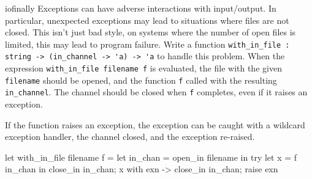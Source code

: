%
\begin{exercise}{iofinally}
Exceptions can have adverse interactions with input/output.  In
particular, unexpected exceptions may lead to situations where files
are not closed.  This isn't just bad style, on systems where the
number of open files is limited, this may lead to program failure.
Write a function
%
\hbox{\lstinline+with_in_file : string -> (in_channel -> 'a) -> 'a+}
%
to handle this problem.  When the
expression \hbox{\lstinline+with_in_file filename f+} is evaluated,
the file with the given \hbox{\lstinline+filename+} should be opened,
and the function \hbox{\lstinline+f+} called with the
resulting \hbox{\lstinline+in_channel+}.  The channel should be closed
when \hbox{\lstinline+f+} completes, even if it raises an exception.

\begin{answer}\ifanswers
If the function raises an exception, the exception can be caught with a wildcard exception handler,
the channel closed, and the exception re-raised.
\begin{ocaml}
let with_in_file filename f =
   let in_chan = open_in filename in
   try
      let x = f in_chan in
      close_in in_chan;
      x
   with exn ->
      close_in in_chan;
      raise exn
\end{ocaml}
\fi\end{answer}       
\end{exercise}

